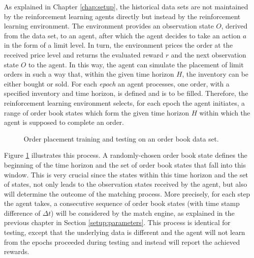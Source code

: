 As explained in Chapter \ref{chap:setup}, the historical data sets are not maintained by the reinforcement learning agents directly but instead by the reinforcement learning environment.
The environment provides an observation state $O$, derived from the data set, to an agent, after which the agent decides to take an action $a$ in the form of a limit level.
In turn, the environment prices the order at the received price level and returns the evaluated reward $r$ and the next observation state $O$ to the agent.
In this way, the agent can simulate the placement of limit orders in such a way that, within the given time horizon $H$, the inventory can be either bought or sold.
For each \textit{epoch} an agent processes, one order, with a specified inventory and time horizon, is defined and is to be filled.
Therefore, the reinforcement learning environment selects, for each epoch the agent initiates, a range of order book states which form the given time horizon $H$ within which the agent is supposed to complete an order.
\begin{figure}[H]
    \centering
    \caption{Order placement training and testing on an order book data set.}
    \label{fig:eval-orderbook-window}
\end{figure}
Figure \ref{fig:eval-orderbook-window} illustrates this process.
A randomly-chosen order book state defines the beginning of the time horizon and the set of order book states that fall into this window.
This is very crucial since the states within this time horizon and the set of states, not only leads to the observation states received by the agent, but also will determine the outcome of the matching process.
More precisely, for each step the agent takes, a consecutive sequence of order book states (with time stamp difference of $\Delta{t}$) will be considered by the match engine, as explained in the previous chapter in Section \ref{setup:parameters}.
This process is identical for testing, except that the underlying data is different and the agent will not learn from the epochs proceeded during testing and instead will report the achieved rewards.

